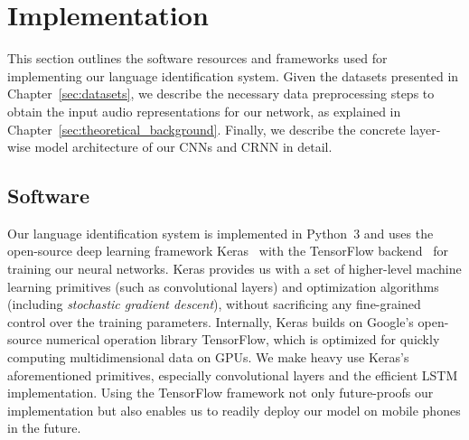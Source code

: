 \section{Implementation}
\label{sec:implementation}
This section outlines the software resources and frameworks used for implementing our language identification system. Given the datasets presented in Chapter~\ref{sec:datasets}, we describe the necessary data preprocessing steps to obtain the input audio representations for our network, as explained in Chapter~\ref{sec:theoretical_background}. Finally, we describe the concrete layer-wise model architecture of our CNNs and CRNN in detail.

\subsection{Software}
\label{sec:software}

	Our language identification system is implemented in Python~3 and uses the open-source deep learning framework Keras~\cite{chollet2015keras} with the TensorFlow backend~\cite{abadi2016tensorflow} for training our neural networks. Keras provides us with a set of higher-level machine learning primitives (such as convolutional layers) and optimization algorithms (including \emph{stochastic gradient descent}), without sacrificing any fine-grained control over the training parameters. Internally, Keras builds on Google's open-source numerical operation library TensorFlow, which is optimized for quickly computing multidimensional data on GPUs. We make heavy use Keras's aforementioned primitives, especially convolutional layers and the efficient LSTM implementation. Using the TensorFlow framework not only future-proofs our implementation but also enables us to readily deploy our model on mobile phones in the future.

